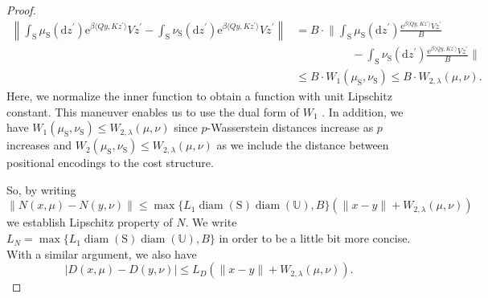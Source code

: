 \documentclass[11pt]{article}
\newcommand{\UU}{\mathbb{U}}
\newcommand{\e}{\mathrm{e}} %
\newcommand{\de}{\mathrm{d}} %
\begin{document}
\begin{proof}
\begin{align*}
    \left\|\int_{\mathrm{S}}\mu_{\mathrm S}(\de z^\prime)\e^{\beta\langle Qy, Kz^\prime\rangle}Vz^\prime - \int_{\mathrm{S}}\nu_{\mathrm S}(\de z^\prime)\e^{\beta\langle Qy, Kz^\prime\rangle}Vz^\prime\right\| &= B\cdot\bigg\|\int_{\mathrm{S}}\mu_{\mathrm S}(\de z^\prime)\frac{\e^{\beta\langle Qy, Kz^\prime\rangle}Vz^\prime}{B} \\&\hspace{5em}- \int_{\mathrm{S}}\nu_{\mathrm S}(\de z^\prime)\frac{\e^{\beta\langle Qy, Kz^\prime\rangle}Vz^\prime}{B}\bigg\|  \\
    &\leq B\cdot W_1(\mu_\mathrm{S},\nu_\mathrm{S}) \leq B \cdot W_{2,\lambda}(\mu,\nu).
\end{align*}
Here, we normalize the inner function to obtain a function with unit Lipschitz constant. This maneuver enables us to use the dual form of $W_1$ \cite[Remark 6.5]{villani2008optimal}. In addition, we have $W_1(\mu_\mathrm{S},\nu_\mathrm{S}) \leq W_{2,\lambda}(\mu,\nu)$ since $p$-Wasserstein distances increase as $p$ increases \cite[Remark 6.6]{villani2008optimal} and $W_{2}(\mu_\mathrm{S},\nu_\mathrm{S}) \leq W_{2,\lambda}(\mu,\nu)$ as we include the distance between positional encodings to the cost structure.

So, by writing 
\begin{equation*}
    \|N(x,\mu) - N(y,\nu)\| \leq \max\{L_1\operatorname{diam}(\mathrm S)\operatorname{diam}(\UU), B\}(\|x-y\| + W_{2,\lambda}(\mu,\nu))
\end{equation*}
we establish Lipschitz property of $N$. We write $L_N = \max\{L_1\operatorname{diam}(\mathrm S)\operatorname{diam}(\UU), B\}$ in order to be a little bit more concise. With a similar argument, we also have
\begin{equation*}
    |D(x,\mu) - D(y,\nu)| \leq L_D(\|x-y\| + W_{2,\lambda}(\mu,\nu)).
\end{equation*}


\end{proof}
\end{document}
